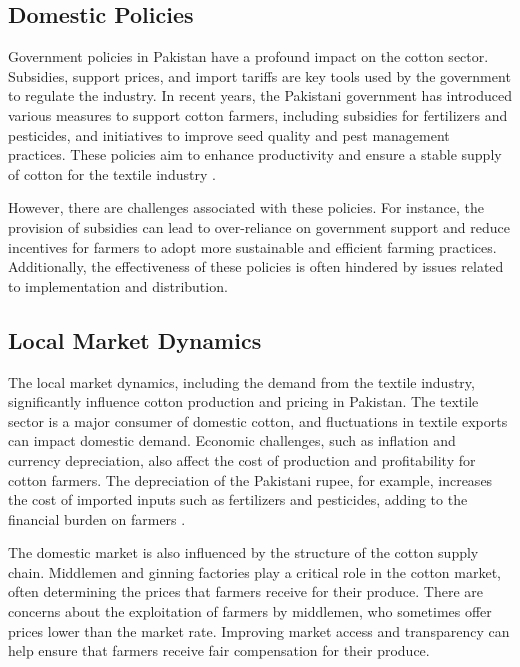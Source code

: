 \documentclass[12pt]{article}
\begin{document}
\subsection{Domestic Policies}

Government policies in Pakistan have a profound impact on the cotton sector. Subsidies, support prices, and import tariffs are key tools used by the government to regulate the industry. In recent years, the Pakistani government has introduced various measures to support cotton farmers, including subsidies for fertilizers and pesticides, and initiatives to improve seed quality and pest management practices. These policies aim to enhance productivity and ensure a stable supply of cotton for the textile industry \cite{usda2022, usda2021}.

However, there are challenges associated with these policies. For instance, the provision of subsidies can lead to over-reliance on government support and reduce incentives for farmers to adopt more sustainable and efficient farming practices. Additionally, the effectiveness of these policies is often hindered by issues related to implementation and distribution.

\subsection{Local Market Dynamics}

The local market dynamics, including the demand from the textile industry, significantly influence cotton production and pricing in Pakistan. The textile sector is a major consumer of domestic cotton, and fluctuations in textile exports can impact domestic demand. Economic challenges, such as inflation and currency depreciation, also affect the cost of production and profitability for cotton farmers. The depreciation of the Pakistani rupee, for example, increases the cost of imported inputs such as fertilizers and pesticides, adding to the financial burden on farmers \cite{oec2023, usda2021}.

The domestic market is also influenced by the structure of the cotton supply chain. Middlemen and ginning factories play a critical role in the cotton market, often determining the prices that farmers receive for their produce. There are concerns about the exploitation of farmers by middlemen, who sometimes offer prices lower than the market rate. Improving market access and transparency can help ensure that farmers receive fair compensation for their produce.
\end{document}
